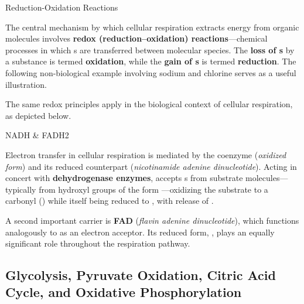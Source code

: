 \documentclass[10pt]{article}
\begin{document}
    \begin{core}{Reduction-Oxidation Reactions}

      The central mechanism by which cellular respiration extracts energy from organic molecules involves \textbf{redox (reduction--oxidation) reactions}---chemical processes in which s are transferred between molecular species. The \textbf{loss of s} by a substance is termed \textbf{oxidation}, while the \textbf{gain of s} is termed \textbf{reduction}. The following non-biological example involving sodium and chlorine serves as a useful illustration.


      The same redox principles apply in the biological context of cellular respiration, as depicted below.


    \end{core}

    \begin{core}{NADH \& FADH2}

      Electron transfer in cellular respiration is mediated by the coenzyme \textbf{} (\textit{oxidized form}) and its reduced counterpart \textbf{} (\textit{nicotinamide adenine dinucleotide}). Acting in concert with \textbf{dehydrogenase enzymes},  accepts s from substrate molecules---typically from hydroxyl groups of the form ---oxidizing the substrate to a carbonyl () while itself being reduced to , with release of .


      A second important  carrier is \textbf{FAD} (\textit{flavin adenine dinucleotide}), which functions analogously to  as an electron acceptor. Its reduced form, , plays an equally significant role throughout the respiration pathway.

    \end{core}

  \subsection{Glycolysis, Pyruvate Oxidation, Citric Acid Cycle, and Oxidative Phosphorylation}
    
\end{document}
